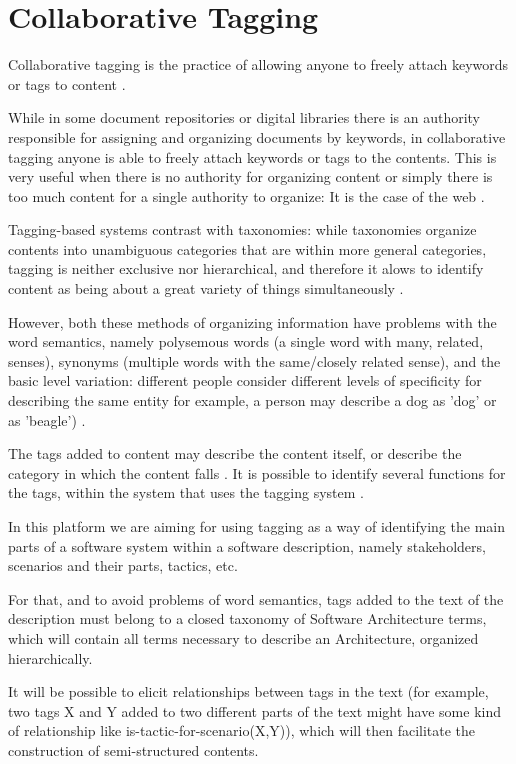 \section{Collaborative Tagging}
Collaborative tagging is the practice of allowing anyone to freely attach keywords or tags to content \cite{golder2006usage}.

While in some document repositories or digital libraries there is an authority responsible for assigning and organizing documents by keywords, in collaborative tagging anyone is able to freely attach keywords or tags to the contents. This is very useful when there is no authority for organizing content or simply there is too much content for a single authority to organize: It is the case of the web \cite{golder2006usage}.

Tagging-based systems contrast with taxonomies: while taxonomies organize contents into unambiguous categories that are within more general categories, tagging is neither exclusive nor hierarchical, and therefore it alows to identify content as being about a great variety of things simultaneously \cite{golder2006usage}. 

However, both these methods of organizing information have problems with the word semantics, namely polysemous words (a single word with many, related, senses), synonyms (multiple words with the same/closely related sense), and the basic level variation: different people consider different levels of specificity for describing the same entity for example, a person may describe a dog as 'dog' or as 'beagle') \cite{tanaka1991object}. 

The tags added to content may describe the content itself, or describe the category in which the content falls \cite{coates2005two}. It is possible to identify several functions for the tags, within the system that uses the tagging system \cite{golder2006usage}.

In this platform we are aiming for using tagging as a way of identifying the main parts of a software system within a software description, namely stakeholders, scenarios and their parts, tactics, etc. 

For that, and to avoid problems of word semantics, tags added to the text of the description must belong to a closed taxonomy of Software Architecture terms, which will contain all terms necessary to describe an Architecture, organized hierarchically. 

It will be possible to elicit relationships between tags in the text (for example, two tags X and Y added to two different parts of the text might have some kind of relationship like is-tactic-for-scenario(X,Y)), which will then facilitate the construction of semi-structured contents.



